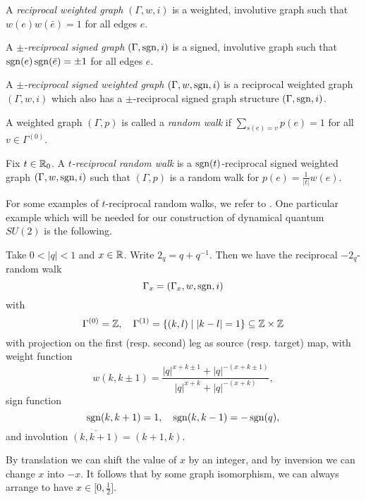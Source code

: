 \begin{Def} A \emph{reciprocal weighted graph} $(\Gamma,w,i)$ is a weighted, involutive graph such that $w(e)w(\bar{e}) = 1$ for all edges $e$. 

A \emph{$\pm$-reciprocal signed graph} $(\Gamma,\operatorname{\mathrm{sgn}},i)$ is a signed, involutive graph such that $\operatorname{\mathrm{sgn}}(e)\operatorname{\mathrm{sgn}}(\bar{e}) = \pm 1$ for all edges $e$. 

A \emph{$\pm$-reciprocal signed weighted graph} $(\Gamma,w,\operatorname{\mathrm{sgn}},i)$ is a reciprocal weighted graph $(\Gamma,w,i)$ which also has a $\pm$-reciprocal signed graph structure $(\Gamma,\operatorname{\mathrm{sgn}},i)$. 

A weighted graph $(\Gamma,p)$ is called a \emph{random walk} if $\sum_{s(e)=v} p(e) = 1$ for all $v\in \Gamma^{(0)}$.
\end{Def}

\begin{Def} Fix $t\in \mathbb{R}_0$. A \emph{$t$-reciprocal random walk} is a $\operatorname{\mathrm{sgn}}(t)$-reciprocal signed weighted graph $(\Gamma,w,\operatorname{\mathrm{sgn}},i)$ such that $(\Gamma,p)$ is a random walk for $p(e) = \frac{1}{|t|}w(e)$.  
\end{Def}


For some examples of $t$-reciprocal random walks, we refer to \cite{DCY1}. One particular example which will be needed for our construction of dynamical quantum $SU(2)$ is the following.

\begin{Exa} Take $0<|q|<1$ and $x\in \mathbb{R}$. Write $2_q = q+q^{-1}$. Then we have the reciprocal $-2_q$-random walk \[\Gamma_x =(\Gamma_x,w,\operatorname{\mathrm{sgn}},i)\] with \[ \Gamma^{(0)} = \mathbb{Z},\quad \Gamma^{(1)} = \{(k,l)\mid |k-l|= 1\}\subseteq \mathbb{Z}\times \mathbb{Z}\] with projection on the first (resp. second) leg as source (resp. target) map, with weight function \[w(k,k\pm 1) = \frac{|q|^{x+k\pm 1}+|q|^{-(x+k\pm 1)}}{|q|^{x+k}+|q|^{-(x+k)}},\] sign function \[\operatorname{\mathrm{sgn}}(k,k+1) = 1,\quad \operatorname{\mathrm{sgn}}(k,k-1) = -\operatorname{\mathrm{sgn}}(q),\] and involution $\overline{(k,k+1)} = (k+1,k)$. 

By translation we can shift the value of $x$ by an integer, and by inversion we can change $x$ into $-x$. It follows that by some graph isomorphism, we can always arrange to have $x\in \lbrack 0,\frac{1}{2}\rbrack$.
\end{Exa} 


